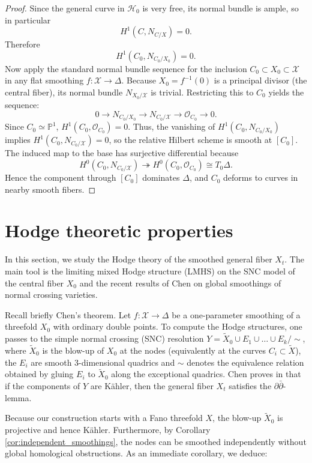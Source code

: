 \documentclass[11pt]{article}
\theoremstyle{definition}
\newcommand{\OO}{\mathcal{O}}
\begin{document}
\begin{proof}
Since the general curve in $\mathcal H_0$ is very free, its normal bundle is
ample, so in particular
\[
H^1(C,N_{C/X})=0.
\]
Therefore
\[
H^1(C_0,N_{C_0/X_0})=0.
\]
Now apply the standard normal bundle sequence for the inclusion
$C_0\subset X_0\subset \mathcal X$ in any flat smoothing $f: \mathcal X\to\Delta$. Because $X_0 = f^{-1}(0)$ is a principal divisor (the central fiber), its normal bundle $N_{X_0/\mathcal X}$ is trivial. Restricting this to $C_0$ yields the sequence:
\[
0\to N_{C_0/X_0}\to N_{C_0/\mathcal X}\to \OO_{C_0}\to 0.
\]
Since $C_0 \simeq \mathbb{P}^1$, $H^1(C_0, \OO_{C_0}) = 0$. Thus, the vanishing of $H^1(C_0,N_{C_0/X_0})$ implies $H^1(C_0,N_{C_0/\mathcal X})=0$,
so the relative Hilbert scheme is smooth at $[C_0]$. The induced map to the base
has surjective differential because
\[
H^0(C_0,N_{C_0/\mathcal X})\twoheadrightarrow H^0(C_0,\OO_{C_0})
\cong T_0\Delta.
\]
Hence the component through $[C_0]$ dominates $\Delta$, and $C_0$ deforms to
curves in nearby smooth fibers.
\end{proof}

\section{Hodge theoretic properties}
\label{s:hodge}

In this section, we study the Hodge theory of the smoothed general fiber $X_t$. The main tool is the limiting mixed Hodge structure (LMHS) on the SNC model of the central fiber $X_0$ and the recent results of Chen \cite{Che24} on global smoothings of normal crossing varieties.

Recall briefly Chen's theorem. Let $f \colon \mathcal{X} \to \Delta$ be a one-parameter smoothing of a threefold $X_0$ with ordinary double points. To compute the Hodge structures, one passes to the simple normal crossing (SNC) resolution $Y = \tilde{X}_0 \cup E_1 \cup \dots \cup E_k/ \sim$, where $\tilde{X}_0$ is the blow-up of $X_0$ at the nodes (equivalently at the curves $C_i\subset \tilde X$), the $E_i$ are smooth 3-dimensional quadrics and $\sim$ denotes the equivalence relation obtained by gluing $E_i$ to $\tilde X_0$ along the exceptional quadrics. Chen proves in \cite[Theorem 4.1]{Che24} that if the components of $Y$ are K\"ahler, then the general fiber $X_t$ satisfies the $\partial\bar{\partial}$-lemma. 

Because our construction starts with a Fano threefold $X$, the blow-up $\tilde{X}_0$ is projective and hence K\"ahler. Furthermore, by Corollary \ref{cor:independent_smoothings}, the nodes can be smoothed independently without global homological obstructions. As an immediate corollary, we deduce:
\end{document}
